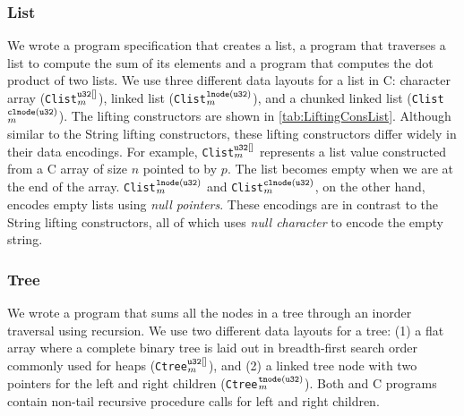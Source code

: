 \subsubsection{List} We wrote a \SpecL{} program specification that creates a list, a
program that traverses a list to compute the sum of its elements and a program
that computes the dot product of two lists. We use three different
data layouts for a list in C: character array ({\tt Clist}$_m^{\tt u32[]}$),
linked list ({\tt Clist}$_m^{\tt lnode(u32)}$), and
a chunked linked list ({\tt Clist}$_m^{\tt clnode(u32)}$).
The lifting constructors are shown in \cref{tab:LiftingConsList}.
Although similar to the String lifting constructors, these lifting
constructors differ widely in their data encodings. For example,
{\tt Clist}$_m^{\tt u32[]}$ represents a list value constructed
from a C array of size $n$ pointed to by $p$. The list becomes empty
when we are at the end of the array. {\tt Clist}$_m^{\tt lnode(u32)}$
and {\tt Clist}$_m^{\tt clnode(u32)}$, on the other hand, encodes empty
lists using {\em null pointers}. These encodings are in contrast to the
String lifting constructors, all of which uses {\em null character} to
encode the empty string.


\vspace{-10px}
\subsubsection{Tree} We wrote a \SpecL{} program that sums all the nodes in a tree
through an inorder traversal using recursion. We use two different data layouts for a tree: 
(1) a flat array where a
complete binary tree is laid out in breadth-first search order commonly used for heaps ({\tt Ctree}$_m^{\tt u32[]}$),
and (2) a linked tree node with two pointers for the left and right children ({\tt Ctree}$_m^{\tt tnode(u32)}$).
Both \SpecL{} and C programs contain non-tail recursive procedure calls for left and right children.


\vspace{-10px}
